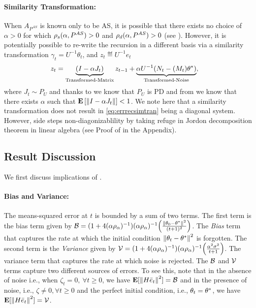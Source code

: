 \paragraph{Similarity Transformation:} When $A_{P^{AS}}$ is known only to be AS, it is possible that there exists no choice of $\alpha>0$ for which $\rho_s(\alpha,P^{AS})>0$ and $\rho_d(\alpha,P^{AS})>0$ (see ). However, it is potentially possible to re-write the recursion in a different basis via a similarity transformation $\gamma_t=U^{-1 }\theta_t$, and $z_t\eqdef U^{-1} e_t$
\begin{align}\label{eq:errecsimtran}
z_t&=\underbrace{(I-\alpha J_t)}_{\text{Transformed-Matrix}} z_{t-1}+\underbrace{\alpha U^{-1}(N_t -(M_t)\theta^*)}_{\text{Transformed-Noise}},
\end{align}
where $J_t\sim P_U$ and thanks to  we know that $P_U$ is PD and from  we know that there exists $\alpha$ such that $\mathbf{E}\left[\left\| I-\alpha J_t\right\|\right]<1$. We note here that a similarity transformation does not result in \eqref{eq:errrecsimtran} being a diagonal system. However,  side steps non-diagonizablility by taking refuge in Jordon decomposition theorem in linear algebra (see Proof of  in the Appendix).
\subsection{Result Discussion}
We first discuss implications of .
\paragraph{Bias and Variance:} The means-squared error at $t$ is bounded by a sum of two terms. The first term is the bias term given by $\mathcal{B}=(1+4(\alpha\rho_{\alpha})^{-1}) (\alpha\rho_{\alpha})^{-1} \Big(\frac{\left\| \theta_0-\theta^*\right\|^2}{(t+1)^2}\Big)$.  The \emph{Bias} term that captures the rate at which the initial condition $\left\| \theta_t-\theta^*\right\|^2$ is forgotten. The second term is the \emph{Variance} given by $\mathcal{V}=(1+4(\alpha\rho_{\alpha})^{-1}) (\alpha\rho_{\alpha})^{-1} \Big(\frac{\alpha^2\sigma^2}{t+1} \Big)$. The variance term that captures the rate at which noise is rejected. The $\mathcal{B}$ and $\mathcal{V}$ terms capture two different sources of errors. To see this, note that in the absence of noise i.e., when $\zeta_t=0,~\forall t\geq 0$, we have $\mathbf{E}[\left\| H\bar{e}_t\right\|^2]=\mathcal{B}$ and in the presence of noise, i.e., $\zeta\neq 0,\forall t\geq 0$ and the perfect initial condition, i.e., $\theta_t=\theta^*$, we have $\mathbf{E}[\left\| H\bar{e}_t\right\|^2]=\mathcal{V}$.
